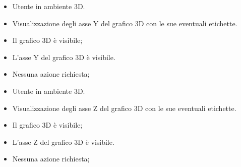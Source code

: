 \UCdsc
    { %
        \begin{itemize}
            \item Utente in ambiente 3D.
        \end{itemize}
    }
    { %
        \begin{itemize}
            \item Visualizzazione degli asse Y del grafico 3D con le sue eventuali etichette.
        \end{itemize}
    }
    { %
        \begin{itemize}
            \item Il grafico 3D è visibile;
        \end{itemize}
    }
    { %
        \begin{itemize}
            \item L'asse Y del grafico 3D è visibile.
        \end{itemize}
    }
    { %
        \begin{itemize}
            \item Nessuna azione richiesta;
        \end{itemize}
    }

\UCdsc
    { %
        \begin{itemize}
            \item Utente in ambiente 3D.
        \end{itemize}
    }
    { %
        \begin{itemize}
            \item Visualizzazione degli asse Z del grafico 3D con le sue eventuali etichette.
        \end{itemize}
    }
    { %
        \begin{itemize}
            \item Il grafico 3D è visibile;
        \end{itemize}
    }
    { %
        \begin{itemize}
            \item L'asse Z del grafico 3D è visibile.
        \end{itemize}
    }
    { %
        \begin{itemize}
            \item Nessuna azione richiesta;
        \end{itemize}
    }

